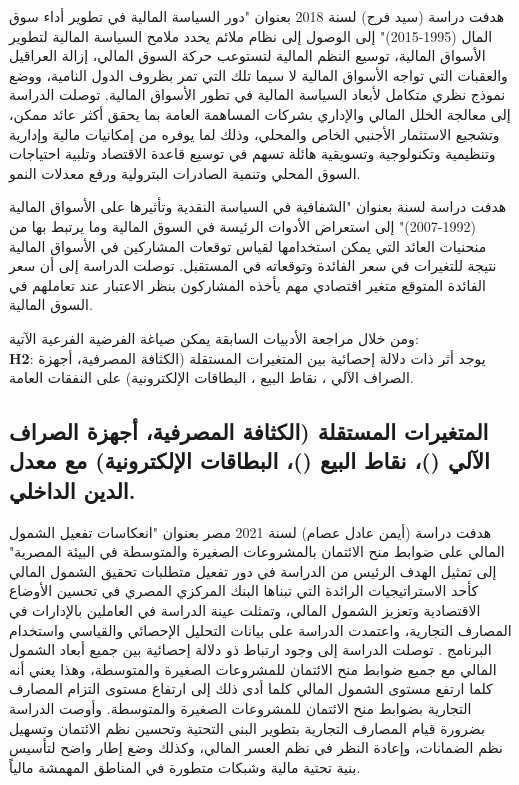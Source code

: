 \documentclass[10pt,a4paper]{report}
\begin{document}
\begin{doublespacing}
هدفت دراسة (سيد فرح) لسنة 2018 بعنوان "دور السياسة المالية في تطوير أداء سوق المال (1995-2015)" إلى الوصول إلى نظام ملائم يحدد ملامح السياسة المالية لتطوير الأسواق المالية، توسيع النظم المالية لتستوعب حركة السوق المالي، إزالة العراقيل والعقبات التي تواجه الأسواق المالية لا سيما تلك التي تمر بظروف الدول النامية، ووضع نموذج نظري متكامل لأبعاد السياسة المالية في تطور الأسواق المالية. توصلت الدراسة إلى معالجة الخلل المالي والإداري بشركات المساهمة العامة بما يحقق أكثر عائد ممكن، وتشجيع الاستثمار الأجنبي الخاص والمحلي، وذلك لما يوفره من إمكانيات مالية وإدارية وتنظيمية وتكنولوجية وتسويقية هائلة تسهم في توسيع قاعدة الاقتصاد وتلبية احتياجات السوق المحلي وتنمية الصادرات البترولية ورفع معدلات النمو. 

هدفت دراسة  لسنة  بعنوان "الشفافية في السياسة النقدية وتأثيرها على الأسواق المالية (1992-2007)" إلى استعراض الأدوات الرئيسة في السوق المالية وما يرتبط بها من منحنيات العائد التي يمكن استخدامها لقياس توقعات المشاركين في الأسواق المالية نتيجة للتغيرات في سعر الفائدة وتوقعاته في المستقبل. توصلت الدراسة إلى أن سعر الفائدة المتوقع متغير اقتصادي مهم يأخذه المشاركون بنظر الاعتبار عند تعاملهم في السوق المالية.

ومن خلال مراجعة الأدبيات السابقة يمكن صياغة الفرضية الفرعية الآتية: \\
	\textbf{H2}: يوجد أثر ذات دلالة إحصائية بين المتغيرات المستقلة (الكثافة المصرفية، أجهزة الصراف الآلي ، نقاط البيع ، البطاقات الإلكترونية) على النفقات العامة.
\subsection{المتغيرات المستقلة ({الكثافة المصرفية}، {أجهزة الصراف الآلي} ()، {نقاط البيع} ()، {البطاقات الإلكترونية}) مع معدل الدين الداخلي.
}
هدفت دراسة (أيمن عادل عصام) لسنة 2021 مصر بعنوان "انعكاسات تفعيل الشمول المالي على ضوابط منح الائتمان بالمشروعات الصغيرة والمتوسطة في البيئة المصرية" إلى تمثيل الهدف الرئيس من الدراسة في دور تفعيل متطلبات تحقيق الشمول المالي كأحد الاستراتيجيات الرائدة التي تبناها البنك المركزي المصري في تحسين الأوضاع الاقتصادية وتعزيز الشمول المالي، وتمثلت عينة الدراسة في العاملين بالإدارات في المصارف التجارية، واعتمدت الدراسة على بيانات التحليل الإحصائي والقياسي واستخدام البرنامج . توصلت الدراسة إلى وجود ارتباط ذو دلالة إحصائية بين جميع أبعاد الشمول المالي مع جميع ضوابط منح الائتمان للمشروعات الصغيرة والمتوسطة، وهذا يعني أنه كلما ارتفع مستوى الشمول المالي كلما أدى ذلك إلى ارتفاع مستوى التزام المصارف التجارية بضوابط منح الائتمان للمشروعات الصغيرة والمتوسطة. وأوصت الدراسة بضرورة قيام المصارف التجارية بتطوير البنى التحتية وتحسين نظم الائتمان وتسهيل نظم الضمانات، وإعادة النظر في نظم العسر المالي، وكذلك وضع إطار واضح لتأسيس بنية تحتية مالية وشبكات متطورة في المناطق المهمشة مالياً.


\end{doublespacing}
\end{document}

